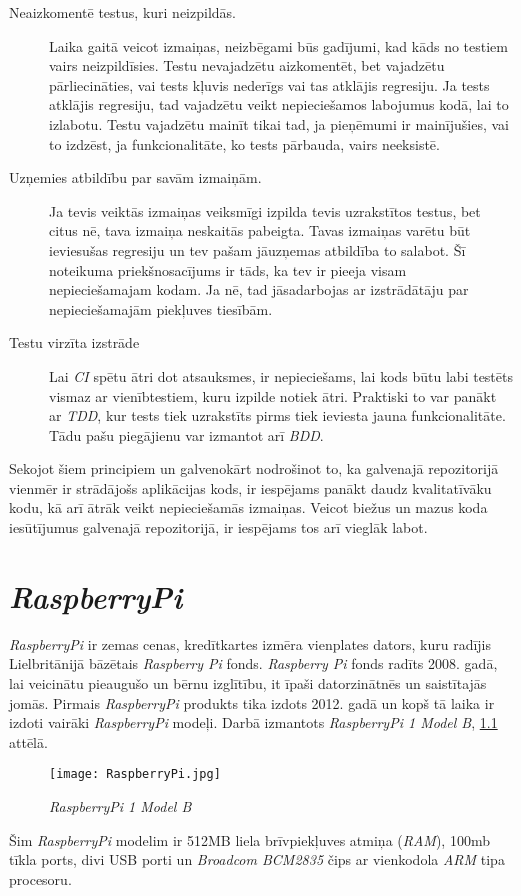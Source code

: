 \begin{description}
	\item [Neaizkomentē testus, kuri neizpildās.] Laika gaitā veicot izmaiņas, neizbēgami būs gadījumi, kad kāds no testiem vairs neizpildīsies. Testu nevajadzētu aizkomentēt, bet vajadzētu pārliecināties, vai tests kļuvis nederīgs vai tas atklājis regresiju. Ja tests atklājis regresiju, tad vajadzētu veikt nepieciešamos labojumus kodā, lai to izlabotu. Testu vajadzētu mainīt tikai tad, ja pieņēmumi ir mainījušies, vai to izdzēst, ja funkcionalitāte, ko tests pārbauda, vairs neeksistē.
	\item [Uzņemies atbildību par savām izmaiņām.] Ja tevis veiktās izmaiņas veiksmīgi izpilda tevis uzrakstītos testus, bet citus nē, tava izmaiņa neskaitās pabeigta. Tavas izmaiņas varētu būt ieviesušas regresiju un tev pašam jāuzņemas atbildība to salabot. Šī noteikuma priekšnosacījums ir tāds, ka tev ir pieeja visam nepieciešamajam kodam. Ja nē, tad jāsadarbojas ar izstrādātāju par nepieciešamajām piekļuves tiesībām.
	\item [Testu virzīta izstrāde] Lai \textit{CI} spētu ātri dot atsauksmes, ir nepieciešams, lai kods būtu labi testēts vismaz ar vienībtestiem, kuru izpilde notiek ātri. Praktiski to var panākt ar \textit{TDD}, kur tests tiek uzrakstīts pirms tiek ieviesta jauna funkcionalitāte. Tādu pašu piegājienu var izmantot arī \textit{BDD}.
\end{description}
Sekojot šiem principiem un galvenokārt nodrošinot to, ka galvenajā repozitorijā vienmēr ir strādājošs aplikācijas kods, ir iespējams panākt daudz kvalitatīvāku kodu, kā arī ātrāk veikt nepieciešamās izmaiņas. Veicot biežus un mazus koda iesūtījumus galvenajā repozitorijā, ir iespējams tos arī vieglāk labot.


\chapter{\textit{RaspberryPi}}
\textit{RaspberryPi} ir zemas cenas, kredītkartes izmēra vienplates dators, kuru radījis Lielbritānijā bāzētais \textit{Raspberry Pi} fonds. \textit{Raspberry Pi} fonds radīts 2008. gadā, lai veicinātu pieaugušo un bērnu izglītību, it īpaši datorzinātnēs un saistītajās jomās. Pirmais \textit{RaspberryPi} produkts tika izdots 2012. gadā un kopš tā laika ir izdoti vairāki \textit{RaspberryPi} modeļi. Darbā izmantots \textit{RaspberryPi 1 Model B}, \ref{fig:RaspberryPi} attēlā.
\cite{raspberryHelp}
\begin{figure}[H]%
	\centering
	\captionsetup{justification=centering}
	\texttt{[image: RaspberryPi.jpg]}
	\caption{\textit{RaspberryPi 1 Model B}}
	\label{fig:RaspberryPi}
\end{figure}
Šim \textit{RaspberryPi} modelim ir 512MB liela brīvpiekļuves atmiņa (\textit{RAM}), 100mb tīkla ports, divi USB porti un \textit{Broadcom BCM2835} čips ar vienkodola \textit{ARM} tipa procesoru.

